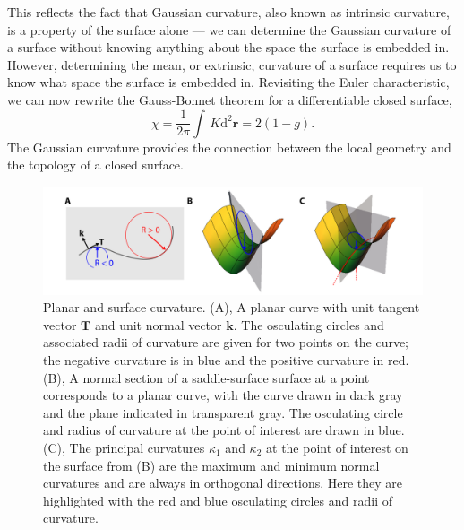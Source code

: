 This reflects the fact that Gaussian curvature, also known as intrinsic curvature, is a property of the surface alone --- we can determine the Gaussian curvature of a surface without knowing anything about the space the surface is embedded in.
However, determining the mean, or extrinsic, curvature of a surface requires us to know what space the surface is embedded in.
Revisiting the Euler characteristic, we can now rewrite the Gauss-Bonnet theorem for a differentiable closed surface,
\begin{equation}
  \chi = \frac{1}{2 \pi} \int \, K \textrm{d}^2\mathbf{r} = 2(1-g)\label{e:1-GB2}.
\end{equation}
The Gaussian curvature provides the connection between the local geometry and the topology of a closed surface.
\begin{figure}
  \centering
  \includegraphics{figures/C1/Ch1-Figs_Curvature.png}
  \caption{Planar and surface curvature.
  (A), A planar curve with unit tangent vector $\mathbf{T}$ and unit normal vector $\mathbf{k}$. The osculating circles and associated radii of curvature are given for two points on the curve; the negative curvature is in blue and the positive curvature in red.
  (B), A normal section of a saddle-surface surface at a point corresponds to a planar curve, with the curve drawn in dark gray and the plane indicated in transparent gray.
  The osculating circle and radius of curvature at the point of interest are drawn in blue.
  (C), The principal curvatures $\kappa_1$ and $\kappa_2$ at the point of interest on the surface from (B) are the maximum and minimum normal curvatures and are always in orthogonal directions. Here they are highlighted with the red and blue osculating circles and radii of curvature.}\label{f:1-Curvature}
\end{figure}

